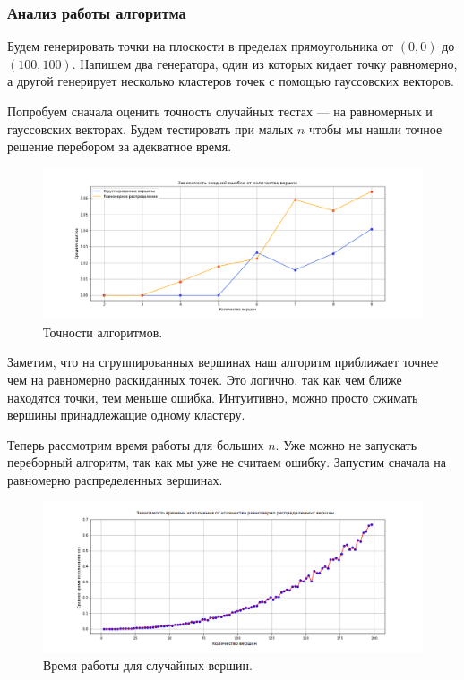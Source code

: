 \documentclass[a4paper,12pt]{article}
\theoremstyle{plain}
\theoremstyle{definition}
\theoremstyle{remark}
\begin{document}
\subsubsection{Анализ работы алгоритма}
Будем генерировать точки на плоскости в пределах прямоугольника от $\left(0, 0\right)$ до $\left(100, 100\right)$. Напишем два генератора, один из которых кидает точку равномерно, а другой генерирует несколько кластеров точек с помощью гауссовских векторов. 

Попробуем сначала оценить точность случайных тестах --- на равномерных и гауссовских векторах. Будем тестировать при малых $n$ чтобы мы нашли точное решение перебором за адекватное время.

\begin{figure}[h!]
    \includegraphics[width=18cm]{img/graph3.png}
    \centering
    \caption{Точности алгоритмов.}
\end{figure}

Заметим, что на сгруппированных вершинах наш алгоритм приближает точнее чем на равномерно раскиданных точек. Это логично, так как чем ближе находятся точки, тем меньше ошибка. Интуитивно, можно просто сжимать вершины принадлежащие одному кластеру.

\newpage

Теперь рассмотрим время работы для больших $n$. Уже можно не запускать переборный алгоритм, так как мы уже не считаем ошибку. Запустим сначала на равномерно распределенных вершинах.

\begin{figure}[h!]
    \includegraphics[width=18cm]{img/graph0.png}
    \centering
    \caption{Время работы для случайных вершин.}
\end{figure}
\end{document}
